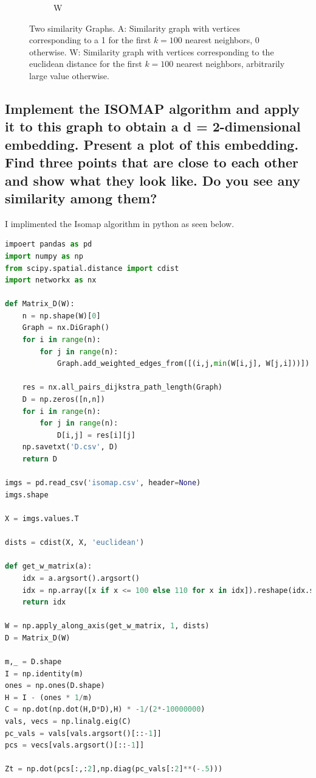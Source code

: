 \documentclass[a4paper]{article}
\begin{document}
\begin{figure}[h]
\begin{subfigure}[b]{0.3\textwidth}
        \caption{W}
        \label{W}
    \end{subfigure}
    \caption{Two similarity Graphs. A: Similarity graph with vertices corresponding to a 1 for the first $k=100$ nearest neighbors, 0 otherwise. W: Similarity graph with vertices corresponding to the euclidean distance for the first $k=100$ nearest neighbors, arbitrarily large value otherwise.}\label{clusterCompare}
\end{figure}

\subsection{Implement the ISOMAP algorithm and apply it to this graph to obtain a d = 2-dimensional embedding. Present a plot of this embedding. Find three points that are close to each other and show what they look like. Do you see any similarity among them?}


I implimented the Isomap algorithm in python as seen below.
\newpage
\begin{lstlisting}[language=Python]
impoert pandas as pd
import numpy as np
from scipy.spatial.distance import cdist
import networkx as nx

def Matrix_D(W):
    n = np.shape(W)[0]
    Graph = nx.DiGraph()
    for i in range(n):
        for j in range(n):
            Graph.add_weighted_edges_from([(i,j,min(W[i,j], W[j,i]))])

    res = nx.all_pairs_dijkstra_path_length(Graph)
    D = np.zeros([n,n])
    for i in range(n):
        for j in range(n):
            D[i,j] = res[i][j]
    np.savetxt('D.csv', D)
    return D

imgs = pd.read_csv('isomap.csv', header=None)
imgs.shape

X = imgs.values.T

dists = cdist(X, X, 'euclidean')

def get_w_matrix(a):
    idx = a.argsort().argsort()
    idx = np.array([x if x <= 100 else 110 for x in idx]).reshape(idx.shape)
    return idx

W = np.apply_along_axis(get_w_matrix, 1, dists)
D = Matrix_D(W)

m,_ = D.shape
I = np.identity(m)
ones = np.ones(D.shape)
H = I - (ones * 1/m)
C = np.dot(np.dot(H,D*D),H) * -1/(2*-10000000)
vals, vecs = np.linalg.eig(C)
pc_vals = vals[vals.argsort()[::-1]]
pcs = vecs[vals.argsort()[::-1]]

Zt = np.dot(pcs[:,:2],np.diag(pc_vals[:2]**(-.5)))
\end{lstlisting}
\end{document}
